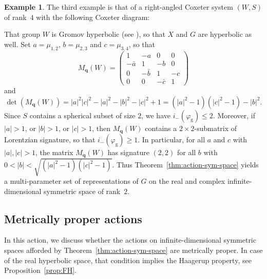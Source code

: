 \documentclass[12pt,a4paper]{amsproc}
\theoremstyle{definition}
\newtheorem{example}[theorem]{Example}
\newcommand{\qq}{\mathbf q}
\newcommand{\rg}{\mathrm g}
\begin{document}
	
\begin{example}\label{ex:3}
The third example is that of a right-angled  Coxeter system $(W, S)$ of rank~$4$ with the following Coxeter diagram:
\begin{center}
\end{center}
That group $W$ is Gromov hyperbolic (see \cite[\S12.6]{Davis}), so that $X$ and $G$ are hyperbolic as well. 
Set $a = \mu_{1, 2}$, $b = \mu_{2, 3}$ and $c = \mu_{3, 4}$, so that $$M_\qq(W) = \left(\begin{array}{cccc}
1 & -a & 0 & 0\\
- \bar a & 1 & -b & 0\\
0 &  - \bar b & 1 & -c\\
0 & 0 & - \bar c & 1
\end{array}\right)$$
and 
$$\det(M_\qq(W) ) = |a|^2 |c|^2 - |a|^2 - |b|^2 - |c|^2 + 1= (|a|^2-1)(|c|^2-1) - |b|^2.$$
Since $S$ contains   a spherical subset of size $2$, we have  $i_-(\varphi_\rg) \leq 2$. Moreover, if $|a| > 1$, or $|b|> 1$, or $|c|>1$, then $M_\qq(W)$ contains a $2\times2$-submatrix of Lorentzian signature, so that $i_-(\varphi_\rg) \geq 1$. In particular, for all $a$ and $c$ with $|a|, |c| > 1$, the matrix $M_\qq(W)$ has signature $(2, 2)$ for all $b$ with $0< |b| < \sqrt{(|a|^2-1)(|c|^2-1)}$. Thus Theorem~\ref{thm:action-sym-space} yields a multi-parameter set of representations of $G$ on  the real and complex infinite-dimensional symmetric space of rank~$2$.
\end{example}


\subsection{Metrically proper actions}\label{sec:proper}

In this action, we discuss whether the actions on infinite-dimensional symmetric spaces afforded by Theorem~\ref{thm:action-sym-space} are metrically proper. In case of the real hyperbolic space, that condition implies the Haagerup property, see Proposition~\ref{prop:FH}.
\end{document}
